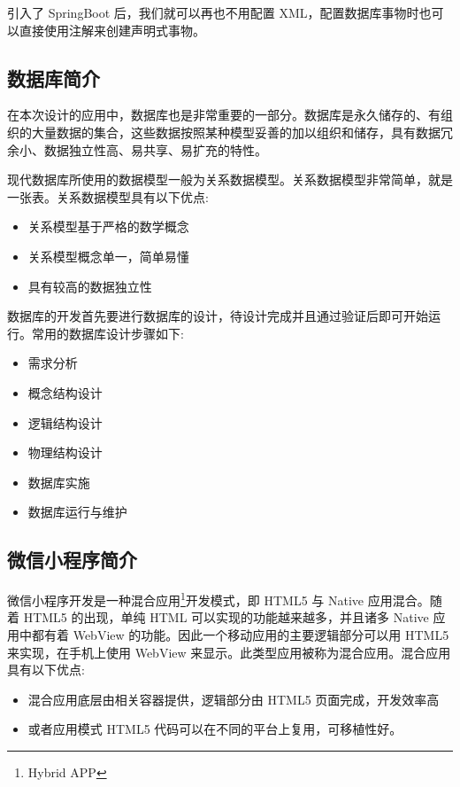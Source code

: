 \documentclass[a4paper, 12pt, UTF8]{ctexart}
\begin{document}
	引入了 SpringBoot 后，我们就可以再也不用配置 XML，配置数据库事物时也可以直接使用注解来创建声明式事物。
	
	\subsection{数据库简介}
	在本次设计的应用中，数据库也是非常重要的一部分。数据库是永久储存的、有组织的大量数据的集合，这些数据按照某种模型妥善的加以组织和储存，具有数据冗余小、数据独立性高、易共享、易扩充的特性\cite{DB2014}。
	
	现代数据库所使用的数据模型一般为关系数据模型。关系数据模型非常简单，就是一张表。关系数据模型具有以下优点:
	\begin{itemize}
  \item 关系模型基于严格的数学概念
  \item 关系模型概念单一，简单易懂
  \item 具有较高的数据独立性\cite{DB2014}
\end{itemize}

	数据库的开发首先要进行数据库的设计，待设计完成并且通过验证后即可开始运行。常用的数据库设计步骤如下:
	\begin{itemize}
  \item 需求分析
  \item 概念结构设计
  \item 逻辑结构设计
  \item 物理结构设计
  \item 数据库实施
  \item 数据库运行与维护
\end{itemize}


	\subsection{微信小程序简介}
	微信小程序开发是一种混合应用\footnote{Hybrid APP}开发模式，即 HTML5 与 Native 应用混合。随着 HTML5 的出现，单纯 HTML 可以实现的功能越来越多，并且诸多 Native 应用中都有着 WebView 的功能。因此一个移动应用的主要逻辑部分可以用 HTML5 来实现，在手机上使用 WebView 来显示。此类型应用被称为混合应用。混合应用具有以下优点:
	\begin{itemize}
  \item 混合应用底层由相关容器提供，逻辑部分由 HTML5 页面完成，开发效率高
  \item 或者应用模式 HTML5 代码可以在不同的平台上复用，可移植性好。
\end{itemize}

	
\end{document}
